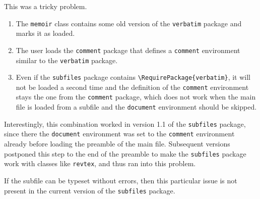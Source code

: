 \documentclass[main]{subfiles}
\begin{document}
This was a tricky problem.
\begin{enumerate}
\item The \verb|memoir| class contains some old version of the
  \verb|verbatim| package and marks it as loaded.
\item The user loads the \verb|comment| package that defines a
  \verb|comment| environment similar to the \verb|verbatim| package.
\item Even if the \verb|subfiles| package contains
  \verb|\RequirePackage{verbatim}|, it will not be loaded a second
  time and the definition of the \verb|comment| environment
  stays the one from the \verb|comment| package, which does not work
  when the main file is loaded from a subfile and the \verb|document|
  environment should be skipped.
\end{enumerate}
Interestingly, this combination worked in version 1.1 of the
\verb|subfiles| package, since there the \verb|document| environment
was set to the \verb|comment| environment already before loading the
preamble of the main file. Subsequent versions postponed this step to
the end of the preamble to make the \verb|subfiles| package work with
classes like \verb|revtex|, and thus ran into this problem.

If the subfile can be typeset without errors, then this particular
issue is not present in the current version of the \verb|subfiles|
package.
\end{document}
